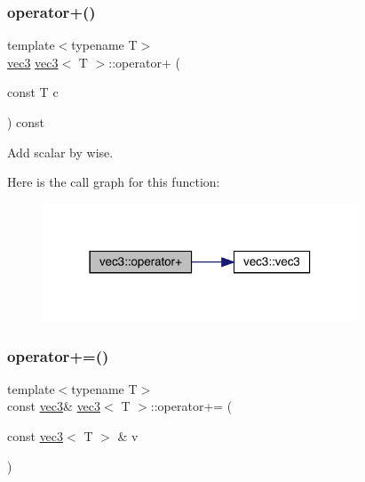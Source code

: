 \subsubsection{\texorpdfstring{operator+()}{operator+()}\hspace{0.1cm}{\footnotesize\ttfamily [2/2]}}
{\footnotesize\ttfamily template$<$typename T$>$ \\
\mbox{\hyperlink{structvec3}{vec3}} \mbox{\hyperlink{structvec3}{vec3}}$<$ T $>$\+::operator+ (\begin{DoxyParamCaption}\item[{const T}]{c }\end{DoxyParamCaption}) const\hspace{0.3cm}{\ttfamily [inline]}}



Add scalar by wise. 

Here is the call graph for this function\+:\nopagebreak
\begin{figure}[H]
\begin{center}
\leavevmode
\includegraphics[width=266pt]{structvec3_a1b9727670ffa0a403e628bfdc966da45_cgraph}
\end{center}
\end{figure}
\mbox{\label{structvec3_a5d12f7aba42eea6253a4ada5ce73b7d8}} 
\subsubsection{\texorpdfstring{operator+=()}{operator+=()}\hspace{0.1cm}{\footnotesize\ttfamily [1/2]}}
{\footnotesize\ttfamily template$<$typename T$>$ \\
const \mbox{\hyperlink{structvec3}{vec3}}\& \mbox{\hyperlink{structvec3}{vec3}}$<$ T $>$\+::operator+= (\begin{DoxyParamCaption}\item[{const \mbox{\hyperlink{structvec3}{vec3}}$<$ T $>$ \&}]{v }\end{DoxyParamCaption})\hspace{0.3cm}{\ttfamily [inline]}}

